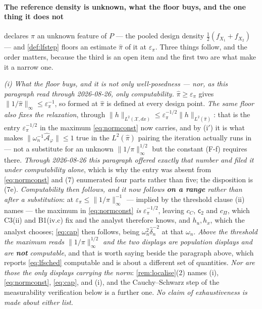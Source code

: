 \paragraph{The reference density is unknown, what the floor buys, and the one thing it does not}

 declares $\pi$ an unknown feature of $P$ --- the pooled design density
$\tfrac12(f_{X_1}+f_{X_2})$ --- and \cref{def:lfstep} floors an estimate $\hat\pi$ of it at
$\varepsilon_\pi$. Three things follow, and the order matters, because the third is an open item and the
first two are what make it a narrow one.

\emph{(i) What the floor buys, and it is not only well-posedness --- nor, as this paragraph read
through 2026-08-26, only computability.} $\hat\pi\ge\varepsilon_\pi$ gives
$\|1/\hat\pi\|_\infty\le\varepsilon_\pi^{-1}$, so  formed at $\hat\pi$ is defined at
every design point. \emph{The same floor also fixes the relaxation}, through
$\|h\|_{L^{2}(\mathcal X,dx)}\le\varepsilon_\pi^{-1/2}\|h\|_{L^{2}(\hat\pi)}$: that is the entry
$\varepsilon_\pi^{-1/2}$ in the maximum \eqref{eq:normconst} now carries, and by
\textup{(i$'$)} it is what makes
$\|\omega_n^{-1}\hat{\mathcal A}_\varphi\|\le1$ true in the $L^{2}(\hat\pi)$ pairing the iteration
actually runs in --- not a substitute for an unknown $\|1/\pi\|_\infty^{1/2}$ but the constant
\textup{(F-f)} requires there. \emph{Through 2026-08-26 this paragraph offered exactly that number and
filed it under computability alone}, which is why the entry was absent from \eqref{eq:normconst} and
\textup{(7)} enumerated four parts rather than five; the disposition is
\textup{(7e)}.
\emph{Computability then follows, and it now follows \textbf{on a range} rather than after a
substitution}: at $\varepsilon_\pi\le\|1/\pi\|^{-1}_\infty$ --- implied by the threshold clause
\textup{(ii)} names --- the maximum in \eqref{eq:normconst} \emph{is} $\varepsilon_\pi^{-1/2}$, leaving
$c_C$, $\mathsf c_2$ and $c_\Pi$, which C3(ii) and B1(iv.c) fix and the analyst therefore knows, and
$h_u,h_x$, which the analyst chooses; \eqref{eq:cap} then follows, being $\omega_n^{2}\hat\delta_n^{-2}$
at that $\omega_n$. \emph{Above the threshold the maximum reads $\|1/\pi\|_\infty^{1/2}$ and the two
displays are population displays and are \textbf{not} computable}, and that is worth saying beside the
paragraph above, which reports \eqref{eq:lfsched}
computable and is about a different set of quantities. \emph{Nor are those the only displays carrying
the norm}: \cref{rem:localise}\textup{(2)} names \textup{(i)},
\eqref{eq:normconst}, \eqref{eq:cap},  and \textup{(i)}, and
the Cauchy--Schwarz step of the measurability verification below is a further one. \emph{No claim of
exhaustiveness is made about either list.}

